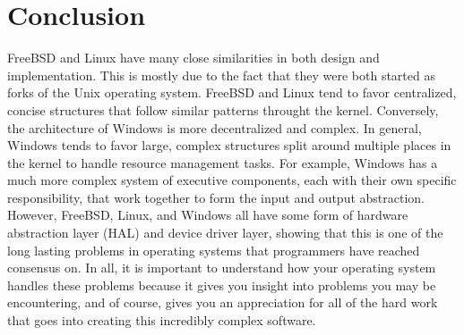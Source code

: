 \documentclass[letterpaper,draftclsnofoot,10pt,onecolumn,titlepage]{IEEEtran}\usepackage[margin=0.75in]{geometry}
\begin{document}
\section{Conclusion}
FreeBSD and Linux have many close similarities in both design and implementation. This is mostly due to the fact
that they were both started as forks of the Unix operating system. FreeBSD and Linux tend to favor centralized, 
concise structures that follow similar patterns throught the kernel. Conversely, the architecture of Windows is
more decentralized and complex. In general, Windows tends to favor large, complex structures split around 
multiple places in the kernel to handle resource management tasks. For example, Windows has a much more complex
system of executive components, each with their own specific responsibility, that work together to form the
input and output abstraction. However, FreeBSD, Linux, and Windows all have some form of hardware abstraction layer
(HAL) and device driver layer, showing that this is one of the long lasting problems in operating systems that 
programmers have reached consensus on. In all, it is important to understand how your operating system handles
these problems because it gives you insight into problems you may be encountering, and of course, gives you an 
appreciation for all of the hard work that goes into creating this incredibly complex software.




\end{document}
